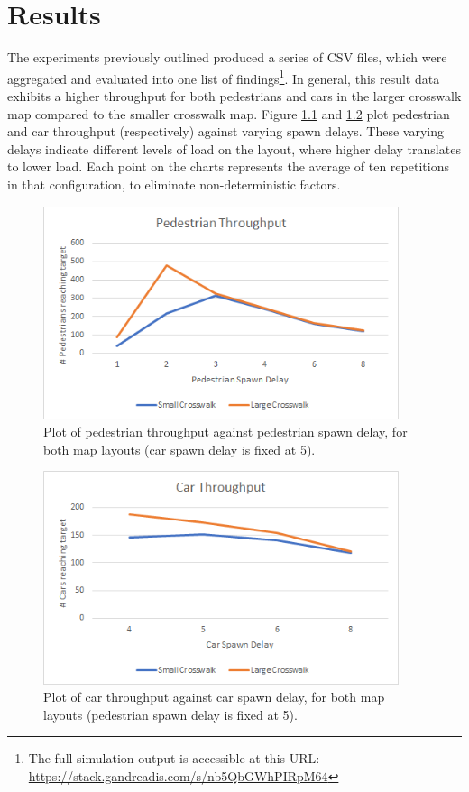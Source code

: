 \chapter{Results} \label{chap:results}

The experiments previously outlined produced a series of CSV files, which were aggregated and evaluated into one list of findings\footnote{The full simulation output is accessible at this URL: \url{https://stack.gandreadis.com/s/nb5QbGWhPIRpM64}}. In general, this result data exhibits a higher throughput for both pedestrians and cars in the larger crosswalk map compared to the smaller crosswalk map. Figure \ref{fig:plot-pedestrian-throughput} and \ref{fig:plot-car-throughput} plot pedestrian and car throughput (respectively) against varying spawn delays. These varying delays indicate different levels of load on the layout, where higher delay translates to lower load. Each point on the charts represents the average of ten repetitions in that configuration, to eliminate non-deterministic factors.

\begin{figure}[h]
    \centering
    \includegraphics[width=4.1in]{images/plot-pedestrian-throughput.png}
    \caption{Plot of pedestrian throughput against pedestrian spawn delay, for both map layouts (car spawn delay is fixed at 5).}
    \label{fig:plot-pedestrian-throughput}
\end{figure}

\begin{figure}[h]
    \centering
    \includegraphics[width=4.1in]{images/plot-car-throughput.png}
    \caption{Plot of car throughput against car spawn delay, for both map layouts (pedestrian spawn delay is fixed at 5).}
    \label{fig:plot-car-throughput}
\end{figure}

